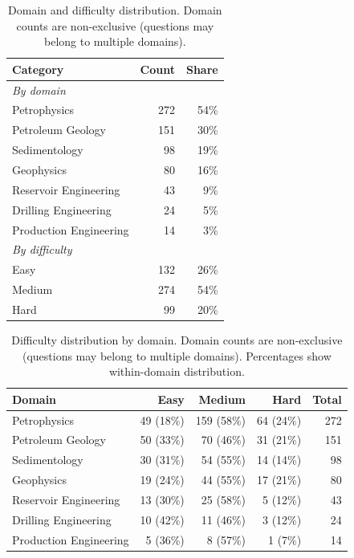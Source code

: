 \documentclass[11pt]{article}
\begin{document}
\begin{table}[htbp]
  \centering
  \caption{Domain and difficulty distribution. Domain counts are non-exclusive (questions may belong to multiple domains).}
  \label{tab:distribution}
  \begin{tabular}{lrr}
    \toprule
    Category & Count & Share \\
    \midrule
    \multicolumn{3}{l}{\textit{By domain}} \\
    Petrophysics & 272 & 54\% \\
    Petroleum Geology & 151 & 30\% \\
    Sedimentology & 98 & 19\% \\
    Geophysics & 80 & 16\% \\
    Reservoir Engineering & 43 & 9\% \\
    Drilling Engineering & 24 & 5\% \\
    Production Engineering & 14 & 3\% \\
    \midrule
    \multicolumn{3}{l}{\textit{By difficulty}} \\
    Easy & 132 & 26\% \\
    Medium & 274 & 54\% \\
    Hard & 99 & 20\% \\
    \bottomrule
  \end{tabular}
\end{table}

\begin{table}[htbp]
  \centering
  \caption{Difficulty distribution by domain. Domain counts are non-exclusive (questions may belong to multiple domains). Percentages show within-domain distribution.}
  \label{tab:diff_domain}
  \begin{tabular}{lrrrr}
    \toprule
    Domain & Easy & Medium & Hard & Total \\
    \midrule
    Petrophysics & 49 (18\%) & 159 (58\%) & 64 (24\%) & 272 \\
    Petroleum Geology & 50 (33\%) & 70 (46\%) & 31 (21\%) & 151 \\
    Sedimentology & 30 (31\%) & 54 (55\%) & 14 (14\%) & 98 \\
    Geophysics & 19 (24\%) & 44 (55\%) & 17 (21\%) & 80 \\
    Reservoir Engineering & 13 (30\%) & 25 (58\%) & 5 (12\%) & 43 \\
    Drilling Engineering & 10 (42\%) & 11 (46\%) & 3 (12\%) & 24 \\
    Production Engineering & 5 (36\%) & 8 (57\%) & 1 (7\%) & 14 \\
    \bottomrule
  \end{tabular}
\end{table}
\end{document}
